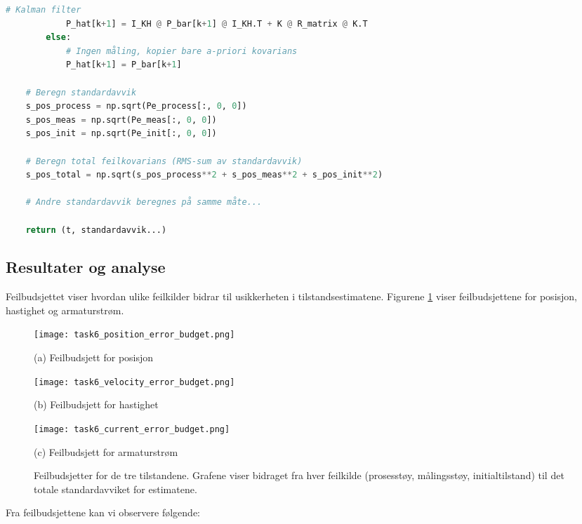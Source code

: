 \documentclass[a4paper,12pt]{article}
\theoremstyle{plain}
\begin{document}
\begin{lstlisting}[language=Python, caption=Implementasjon av feilbudsjett, label=code:error_budget]
            # Kalman filter
            P_hat[k+1] = I_KH @ P_bar[k+1] @ I_KH.T + K @ R_matrix @ K.T
        else:
            # Ingen måling, kopier bare a-priori kovarians
            P_hat[k+1] = P_bar[k+1]
    
    # Beregn standardavvik
    s_pos_process = np.sqrt(Pe_process[:, 0, 0])
    s_pos_meas = np.sqrt(Pe_meas[:, 0, 0])
    s_pos_init = np.sqrt(Pe_init[:, 0, 0])
    
    # Beregn total feilkovarians (RMS-sum av standardavvik)
    s_pos_total = np.sqrt(s_pos_process**2 + s_pos_meas**2 + s_pos_init**2)
    
    # Andre standardavvik beregnes på samme måte...
    
    return (t, standardavvik...)
\end{lstlisting}

\subsection{Resultater og analyse}

Feilbudsjettet viser hvordan ulike feilkilder bidrar til usikkerheten i tilstandsestimatene. Figurene \ref{fig:error_budgets} viser feilbudsjettene for posisjon, hastighet og armaturstrøm.

\begin{figure}[!htb]
\centering
\begin{minipage}{0.32\textwidth}
    \texttt{[image: task6\_position\_error\_budget.png]}
    \caption*{(a) Feilbudsjett for posisjon}
\end{minipage}
\begin{minipage}{0.32\textwidth}
    \texttt{[image: task6\_velocity\_error\_budget.png]}
    \caption*{(b) Feilbudsjett for hastighet}
\end{minipage}
\begin{minipage}{0.32\textwidth}
    \texttt{[image: task6\_current\_error\_budget.png]}
    \caption*{(c) Feilbudsjett for armaturstrøm}
\end{minipage}
\caption{Feilbudsjetter for de tre tilstandene. Grafene viser bidraget fra hver feilkilde (prosesstøy, målingsstøy, initialtilstand) til det totale standardavviket for estimatene.}
\label{fig:error_budgets}
\end{figure}

Fra feilbudsjettene kan vi observere følgende:
\end{document}
